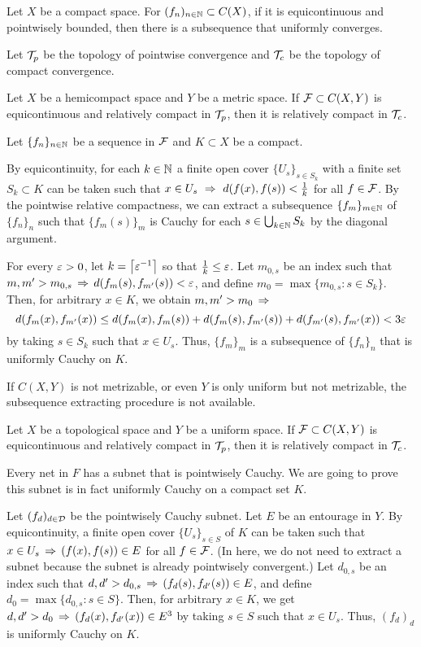 \documentclass{../exp}
\begin{document}
\begin{thm}
Let $X$ be a compact space.
For $(f_n)_{n\in\mathbb{N}}\subset C(X)$, if it is equicontinuous and pointwisely bounded, then there is a subsequence that uniformly converges.
\end{thm}

Let $\mathcal{T}_p$ be the topology of pointwise convergence and $\mathcal{T}_c$ be the topology of compact convergence.
\begin{thm}
Let $X$ be a hemicompact space and $Y$ be a metric space.
If $\mathcal{F}\subset C(X,Y)$ is equicontinuous and relatively compact in $\mathcal{T}_p$, then it is relatively compact in $\mathcal{T}_c$.
\end{thm}
\begin{pf}
Let $\{f_n\}_{n\in\mathbb{N}}$ be a sequence in $\mathcal{F}$ and $K\subset X$ be a compact.

By equicontinuity, for each $k\in\mathbb{N}$ a finite open cover $\{U_s\}_{s\in S_k}$ with a finite set $S_k\subset K$ can be taken such that $x\in U_s\,\,\Rightarrow\,\,d(f(x),f(s))<\frac1k$ for all $f\in\mathcal{F}$.
By the pointwise relative compactness, we can extract a subsequence $\{f_m\}_{m\in\mathbb{N}}$ of $\{f_n\}_n$ such that $\{f_m(s)\}_m$ is Cauchy for each $s\in\bigcup_{k\in\mathbb{N}}S_k$ by the diagonal argument.

For every $\varepsilon>0$, let $k=\left\lceil\varepsilon^{-1}\right\rceil$ so that $\frac1k\le\varepsilon$.
Let $m_{0,s}$ be an index such that $m,m'>m_{0,s}\,\Rightarrow\, d(f_m(s),f_{m'}(s))<\varepsilon$, and define $m_0=\max\{m_{0,s}:s\in S_k\}$.
Then, for arbitrary $x\in K$, we obtain $m,m'>m_0\,\Rightarrow\,$
\[d(f_m(x),f_{m'}(x))\le d(f_m(x),f_m(s))+d(f_m(s),f_{m'}(s))+d(f_{m'}(s),f_{m'}(x))<3\varepsilon\]
by taking $s\in S_k$ such that $x\in U_s$.
Thus, $\{f_m\}_m$ is a subsequence of $\{f_n\}_n$ that is uniformly Cauchy on $K$.
\end{pf}


If $C(X,Y)$ is not metrizable, or even $Y$ is only uniform but not metrizable, the subsequence extracting procedure is not available.

\begin{thm}
Let $X$ be a topological space and $Y$ be a uniform space.
If $\mathcal{F}\subset C(X,Y)$ is equicontinuous and relatively compact in $\mathcal{T}_p$, then it is relatively compact in $\mathcal{T}_c$.
\end{thm}
\begin{pf}[1]
Every net in $F$ has a subnet that is pointwisely Cauchy.
We are going to prove this subnet is in fact uniformly Cauchy on a compact set $K$.

Let $(f_d)_{d\in\mathcal{D}}$ be the pointwisely Cauchy subnet.
Let $E$ be an entourage in $Y$.
By equicontinuity, a finite open cover $\{U_s\}_{s\in S}$ of $K$ can be taken such that $x\in U_s\,\Rightarrow\,(f(x),f(s))\in E$ for all $f\in\mathcal{F}$.
(In here, we do not need to extract a subnet because the subnet is already pointwisely convergent.)
Let $d_{0,s}$ be an index such that $d,d'>d_{0,s}\,\Rightarrow\,(f_d(s),f_{d'}(s))\in E$, and define $d_0=\max\{d_{0,s}:s\in S\}$.
Then, for arbitrary $x\in K$, we get $d,d'>d_0\,\Rightarrow\,(f_d(x),f_{d'}(x))\in E^3$ by taking $s\in S$ such that $x\in U_s$.
Thus, $(f_d)_d$ is uniformly Cauchy on $K$.
\end{pf}
\end{document}
